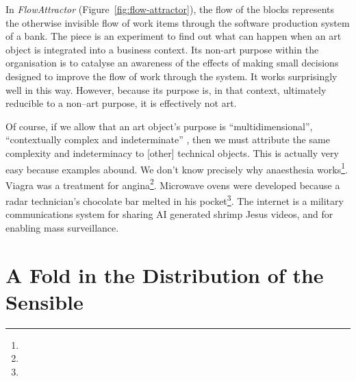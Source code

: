 \documentclass[letter:wpaper]{article}
\begin{document}
    In \emph{FlowAttractor} (Figure~\ref{fig:flow-attractor}), the flow of the blocks represents the otherwise invisible flow of work items through the software production system of a bank. The piece is an experiment to find out what can happen when an art object is integrated into a business context. Its non-art purpose within the organisation is to catalyse an awareness of the effects of making small decisions designed to improve the flow of work through the system. It works surprisingly well in this way. However, because its purpose is, in that context, ultimately reducible to a non–art purpose, it is effectively not art.
    
    Of course, if we allow that an art object's purpose is ``multidimensional'', ``contextually complex and indeterminate'' \citep[p.25]{HoelscherThPtcsOfPhsSpc2014}, then we must attribute the same complexity and indeterminacy to [other] technical objects. This is actually very easy because examples abound. We don't know precisely why anaesthesia works\footnote{

    }. Viagra was a treatment for angina\footnote{
    }. Microwave ovens were developed because a radar technician's chocolate bar melted in his pocket\footnote{
    }. The internet is a military communications system for sharing AI generated shrimp Jesus videos, and for enabling mass surveillance. 

\section{A Fold in the Distribution of the Sensible}
    
\end{document}
